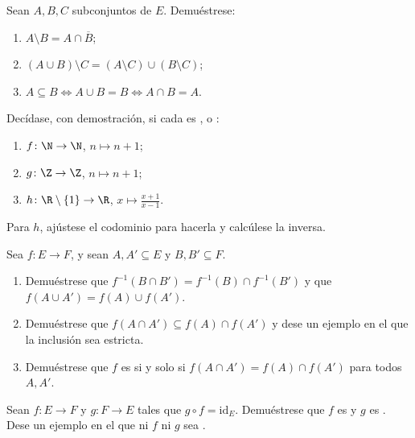 \begin{exercise}[$\star$]\label{exo:b1:logic:6}
Sean $A, B, C$ subconjuntos de $E$. Demuéstrese:
\begin{enumerate}
  \item $A \setminus B = A \cap \overline{B}$;
  \item $(A \cup B) \setminus C = (A \setminus C) \cup (B \setminus
        C)$;
  \item $A \subseteq B \iff A \cup B = B \iff A \cap B = A$.
\end{enumerate}
\end{exercise}

\begin{exercise}[$\star\star$]\label{exo:b1:logic:7}
Decídase, con demostración, si cada  es ,
 o :
\begin{enumerate}
  \item $f \colon \N \to \N$, $n \mapsto n + 1$;
  \item $g \colon \Z \to \Z$, $n \mapsto n + 1$;
  \item $h \colon \R \setminus \{1\} \to \R$, $x \mapsto
        \frac{x+1}{x-1}$.
\end{enumerate}
Para $h$, ajústese el codominio para hacerla  y calcúlese la
inversa.
\end{exercise}

\begin{exercise}[$\star\star$]\label{exo:b1:logic:8}
Sea $f \colon E \to F$, y sean $A, A' \subseteq E$ y $B, B' \subseteq
F$.
\begin{enumerate}
  \item Demuéstrese que $f^{-1}(B \cap B') = f^{-1}(B) \cap f^{-1}(B')$
        y que $f(A \cup A') = f(A) \cup f(A')$.
  \item Demuéstrese que $f(A \cap A') \subseteq f(A) \cap f(A')$ y dese
        un ejemplo en el que la inclusión sea estricta.
  \item Demuéstrese que $f$ es  si y solo si $f(A \cap A') =
        f(A) \cap f(A')$ para todos $A, A'$.
\end{enumerate}
\end{exercise}

\begin{exercise}[$\star\star$]\label{exo:b1:logic:9}
Sean $f \colon E \to F$ y $g \colon F \to E$ tales que $g \circ f =
\mathrm{id}_E$. Demuéstrese que $f$ es  y $g$ es
. Dese un ejemplo en el que ni $f$ ni $g$ sea .
\end{exercise}

